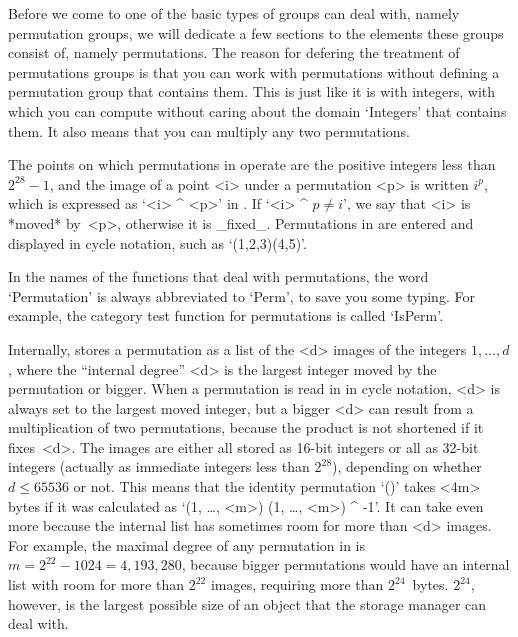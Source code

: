 
\def\labelto#1{\buildrel\lower0.8ex\hbox{$\scriptstyle #1$}\over\to}


Before we come to one of the basic types of  groups {\GAP} can deal with,
namely permutation  groups,  we will   dedicate  a few  sections  to  the
elements these groups consist  of,  namely permutations. The reason   for
defering the treatment  of permutations groups is that  you can work with
permutations without defining  a permutation  group that contains   them.
This is just like it is with integers, with which you can compute without
caring about the domain `Integers' that contains them. It also means that
you can multiply any two permutations.

The points on  which permutations   in  {\GAP} operate  are the  positive
integers less than  $2^{28}-1$,  and the image   of a point <i> under   a
permutation <p> is written $i^p$,  which is expressed  as `<i> ^ <p>'  in
{\GAP}. If `<i> ^ $p\ne i$', we say that <i> is *moved* by~<p>, otherwise
it is _fixed_. Permutations in {\GAP} are  entered and displayed in cycle
notation, such as `(1,2,3)(4,5)'.

In the  names of the  {\GAP} functions  that deal with  permutations, the
word  `Permutation' is  always abbreviated  to `Perm', to  save  you some
typing. For  example,   the category  test  function  for permutations is
called `IsPerm'.

Internally, {\GAP}  stores a permutation as a  list of the  <d> images of
the  integers  $1,\ldots, d$,  where the ``internal  degree'' <d>  is the
largest integer moved by the permutation or bigger. When a permutation is
read  in  in  cycle  notation, <d> is  always  set  to  the largest moved
integer,   but a bigger   <d> can  result  from  a multiplication of  two
permutations, because the product is  not shortened if it fixes~<d>.  The
images are either all stored as 16-bit integers or all as 32-bit integers
(actually as {\GAP} immediate integers less  than $2^{28}$), depending on
whether  $d\le 65536$  or not. This  means that  the identity permutation
`()'  takes <4m> bytes  if it was calculated as   `(1, \dots, <m>) \* (1,
\dots, <m>) ^ -1'. It  can take even more  because the internal list  has
sometimes room for more than <d> images.  For example, the maximal degree
of   any permutation in  {\GAP}  is  $m  = 2^{22}-1024 =  4{,}193{,}280$,
because  bigger permutations  would have  an  internal list with room for
more than $2^{22}$ images, requiring  more than $2^{24}$~bytes. $2^{24}$,
however, is  the  largest possible size   of  an object that  the  {\GAP}
storage manager can deal with.


